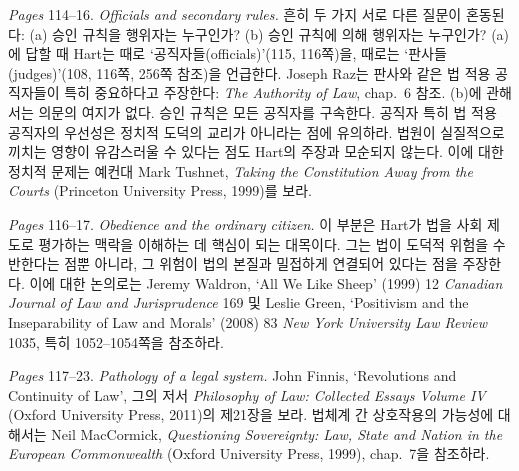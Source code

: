 {\emph{Pages} 114--16. \emph{Officials and secondary rules.} 흔히 두 가지
서로 다른 질문이 혼동된다: (a) 승인 규칙을  행위자는
누구인가? (b) 승인 규칙에 의해  행위자는 누구인가? (a)에
답할 때 Hart는 때로 `공직자들(officials)'(115, 116쪽)을, 때로는
`판사들(judges)'(108, 116쪽, 256쪽 참조)을 언급한다. Joseph Raz는 판사와
같은 법 적용 공직자들이 특히 중요하다고 주장한다: \emph{The Authority of
Law}, chap.~6 참조. (b)에 관해서는 의문의 여지가 없다. 승인 규칙은 모든
공직자를 구속한다. 공직자 특히 법 적용 공직자의 우선성은 정치적 도덕의
교리가 아니라는 점에 유의하라. 법원이 실질적으로 끼치는 영향이
유감스러울 수 있다는 점도 Hart의 주장과 모순되지 않는다. 이에 대한
정치적 문제는 예컨대 Mark Tushnet, \emph{Taking the Constitution Away
from the Courts} (Princeton University Press, 1999)를 보라.

\emph{Pages} 116--17. \emph{Obedience and the ordinary citizen.} 이
부분은 Hart가 법을 사회 제도로 평가하는 맥락을 이해하는 데 핵심이 되는
대목이다. 그는 법이 도덕적 위험을 수반한다는 점뿐 아니라, 그 위험이 법의
본질과 밀접하게 연결되어 있다는 점을 주장한다. 이에 대한 논의로는 Jeremy
Waldron, `All We Like Sheep' (1999) 12 \emph{Canadian Journal of Law and
Jurisprudence} 169 및 Leslie Green, `Positivism and the Inseparability
of Law and Morals' (2008) 83 \emph{New York University Law Review} 1035,
특히 1052--1054쪽을 참조하라.

\emph{Pages} 117--23. \emph{Pathology of a legal system.} John Finnis,
`Revolutions and Continuity of Law', 그의 저서 \emph{Philosophy of Law:
Collected Essays Volume IV} (Oxford University Press, 2011)의 제21장을
보라. 법체계 간 상호작용의 가능성에 대해서는 Neil MacCormick,
\emph{Questioning Sovereignty: Law, State and Nation in the European
Commonwealth} (Oxford University Press, 1999), chap.~7을 참조하라.

}